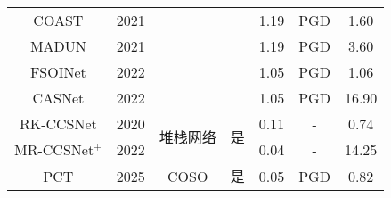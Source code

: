 \begin{table}[htbp]
{\begin{tabular}{ccccccc}
      COAST\cite{COAST}                                   & 2021 &                                                      &                    & 1.19               & PGD\cite{PGD}   & 1.60  \\
      MADUN\cite{MADUN}                                   & 2021 &                                                      &                    & 1.19               & PGD\cite{PGD}   & 3.60  \\
      FSOINet\cite{FSOINET}                               & 2022 &                                                      &                    & 1.05               & PGD\cite{PGD}   & 1.06  \\
      CASNet\cite{CASNET}                                 & 2022 &                                                      &                    & 1.05               & PGD\cite{PGD}   & 16.90 \\
      \cline{1-2}\cline{5-7}
      RK-CCSNet\cite{RK-CCSNet}                           & 2020 & \multirow{2}{*}{堆栈网络}                                & \multirow{2}{*}{是} & 0.11               & -               & 0.74  \\
      MR-CCSNet$^{+}$\cite{MR-CCSNet}                     & 2022 &                                                      &                    & 0.04               & -               & 14.25 \\
      \cline{1-2}\cline{5-7}
      PCT\cite{Practical_compact_deep_compressed_sensing} & 2025 & COSO\cite{Practical_compact_deep_compressed_sensing} & 是                  & 0.05               & PGD\cite{PGD}   & 0.82  \\
      \bottomrule
    \end{tabular}
  }
\end{table}

